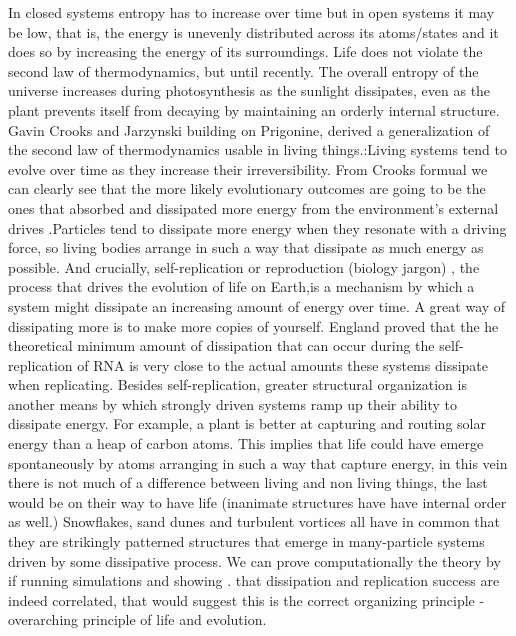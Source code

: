 \documentclass[onecollarge,runningheads]{svjour2}
\begin{document}
In closed systems entropy has to increase over time but in open systems it may be low, that is, the energy is unevenly distributed across its atoms/states and it does so by increasing the energy of its surroundings.
Life does not violate the second law of thermodynamics, but until recently. The overall entropy of the universe increases during photosynthesis as the sunlight dissipates, even as the plant prevents itself from decaying by maintaining an orderly internal structure.
Gavin Crooks and Jarzynski building on Prigonine, derived a generalization of the second law of thermodynamics usable in living things.:Living systems tend to evolve over time as they increase their irreversibility. From Crooks formual we can clearly see that the more likely evolutionary outcomes are going to be the ones that absorbed and dissipated more energy from the environment’s external drives .Particles tend to dissipate more energy when they resonate with a driving force, so living bodies arrange in such a way that dissipate as much energy as possible.
And crucially, self-replication or reproduction (biology jargon) , the process that drives the evolution of life on Earth,is a mechanism by which a system might dissipate an increasing amount of energy over time.  A great way of dissipating more is to make more copies of yourself. England proved that the he theoretical minimum amount of dissipation that can occur during the self-replication of RNA is very close to the actual amounts these systems dissipate when replicating.
Besides self-replication, greater structural organization is another means by which strongly driven systems ramp up their ability to dissipate energy. For example, a plant is better at capturing and routing solar energy than a heap of carbon atoms. This implies that life could have emerge spontaneously by atoms arranging in such a way that capture energy, in this vein there is not much of a difference between living and non living things, the last would be on their way to have life (inanimate structures have have internal order as well.) Snowflakes, sand dunes and turbulent vortices all have in common that they are strikingly patterned structures that emerge in many-particle systems driven by some dissipative process.
We can prove computationally the theory by  if running simulations and showing . that dissipation and replication success are indeed correlated, that would suggest this is the correct organizing principle -overarching principle of life and evolution.
\end{document}
